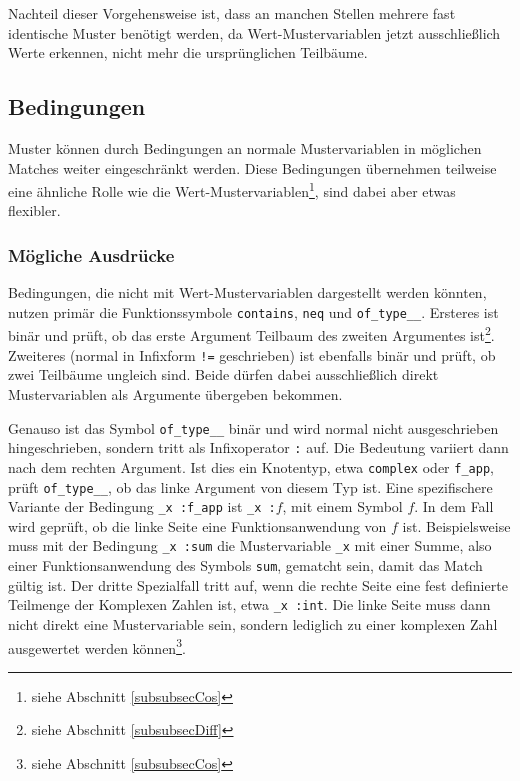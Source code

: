 Nachteil dieser Vorgehensweise ist, dass an manchen Stellen mehrere fast identische Muster benötigt werden, da Wert-Mustervariablen jetzt ausschließlich Werte erkennen, nicht mehr die ursprünglichen Teilbäume. 


\subsection{Bedingungen} \label{subsubsecBedingungen}

Muster können durch Bedingungen an normale Mustervariablen in möglichen Matches weiter eingeschränkt werden.
Diese Bedingungen übernehmen teilweise eine ähnliche Rolle wie die Wert-Mustervariablen\footnote{siehe Abschnitt \ref{subsubsecCos}}, sind dabei aber etwas flexibler. 


\subsubsection{Mögliche Ausdrücke}
Bedingungen, die nicht mit Wert-Mustervariablen dargestellt werden könnten, nutzen primär die Funktionssymbole \verb|contains|, \verb|neq| und \verb|of_type__|. Ersteres ist binär und prüft, ob das erste Argument Teilbaum des zweiten Argumentes ist\footnote{siehe Abschnitt \ref{subsubsecDiff}}. Zweiteres (normal in Infixform \verb|!=| geschrieben) ist ebenfalls binär und prüft, ob zwei Teilbäume ungleich sind. Beide dürfen dabei ausschließlich direkt Mustervariablen als Argumente übergeben bekommen. 

Genauso ist das Symbol \verb|of_type__| binär und wird normal nicht ausgeschrieben hingeschrieben, sondern tritt als Infixoperator \verb|:| auf. Die Bedeutung variiert dann nach dem rechten Argument. Ist dies ein Knotentyp, etwa \verb|complex| oder \verb|f_app|, prüft \verb|of_type__|, ob das linke Argument von diesem Typ ist. Eine spezifischere Variante der Bedingung \verb|_x :f_app| ist {\verb|_x :|$f$}, mit einem Symbol $f$. In dem Fall wird geprüft, ob die linke Seite eine Funktionsanwendung von $f$ ist. Beispielsweise muss mit der Bedingung \verb|_x :sum| die Mustervariable \verb|_x| mit einer Summe, also einer Funktionsanwendung des Symbols \verb|sum|, gematcht sein, damit das Match gültig ist.
Der dritte Spezialfall tritt auf, wenn die rechte Seite eine fest definierte Teilmenge der Komplexen Zahlen ist, etwa \verb|_x :int|. Die linke Seite muss dann nicht direkt eine Mustervariable sein, sondern lediglich zu einer komplexen Zahl ausgewertet werden können\footnote{siehe Abschnitt \ref{subsubsecCos}}.

